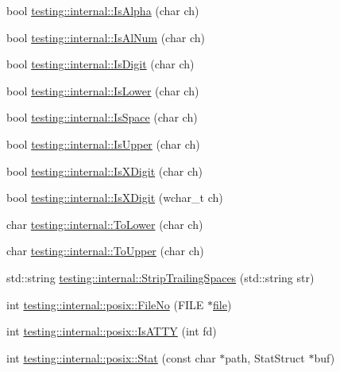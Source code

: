 \begin{DoxyCompactItemize}
\item 
bool \hyperlink{namespacetesting_1_1internal_aeb957087fd6bbf9db98ab7cd41b0c129}{testing\+::internal\+::\+Is\+Alpha} (char ch)
\item 
bool \hyperlink{namespacetesting_1_1internal_a83802e7f23324cd512232203662e1a98}{testing\+::internal\+::\+Is\+Al\+Num} (char ch)
\item 
bool \hyperlink{namespacetesting_1_1internal_a4bd96b7fa6486802d33ddc217af55a39}{testing\+::internal\+::\+Is\+Digit} (char ch)
\item 
bool \hyperlink{namespacetesting_1_1internal_ac26ce3883bc8919c27074975e958f3b7}{testing\+::internal\+::\+Is\+Lower} (char ch)
\item 
bool \hyperlink{namespacetesting_1_1internal_af429e04f70f9c10f6aa76a5d1ccd389f}{testing\+::internal\+::\+Is\+Space} (char ch)
\item 
bool \hyperlink{namespacetesting_1_1internal_a84f3baa379fec6bf5947cb5165aa8cc9}{testing\+::internal\+::\+Is\+Upper} (char ch)
\item 
bool \hyperlink{namespacetesting_1_1internal_aa234ef141278263fb143b616c74c86e7}{testing\+::internal\+::\+Is\+X\+Digit} (char ch)
\item 
bool \hyperlink{namespacetesting_1_1internal_a6ab68a30f8291c09b2289c132bbe3b16}{testing\+::internal\+::\+Is\+X\+Digit} (wchar\+\_\+t ch)
\item 
char \hyperlink{namespacetesting_1_1internal_ad9c627ef2a94245e3fd69e7ab3d49b42}{testing\+::internal\+::\+To\+Lower} (char ch)
\item 
char \hyperlink{namespacetesting_1_1internal_ac1b876a8133895bd553d4780ecaa1e3a}{testing\+::internal\+::\+To\+Upper} (char ch)
\item 
std\+::string \hyperlink{namespacetesting_1_1internal_aa6afda12e567c353e2e9b9c2e8cae14f}{testing\+::internal\+::\+Strip\+Trailing\+Spaces} (std\+::string str)
\item 
int \hyperlink{namespacetesting_1_1internal_1_1posix_a3117b067e1f942a2031e666953120ccc}{testing\+::internal\+::posix\+::\+File\+No} (F\+I\+LE $\ast$\hyperlink{_07copy_08_2_read_camera_model_8m_a151631b2fd2bb776ef06c9f440a7ed74}{file})
\item 
int \hyperlink{namespacetesting_1_1internal_1_1posix_a16ebe936b3a8ea462a94191635aedc27}{testing\+::internal\+::posix\+::\+Is\+A\+T\+TY} (int fd)
\item 
int \hyperlink{namespacetesting_1_1internal_1_1posix_a2b87b7ff647a128614daf50667eb9304}{testing\+::internal\+::posix\+::\+Stat} (const char $\ast$path, Stat\+Struct $\ast$buf)

\end{DoxyCompactItemize}

